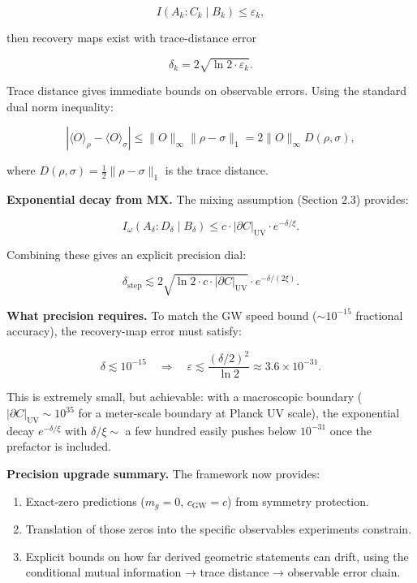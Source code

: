 \[
I(A_k : C_k \mid B_k) \le \varepsilon_k,
\]

then recovery maps exist with trace-distance error

\[
\delta_k = 2\sqrt{\ln 2 \cdot \varepsilon_k}.
\]

Trace distance gives immediate bounds on observable errors. Using the standard dual norm inequality:

\[
|\langle O \rangle_\rho - \langle O \rangle_\sigma|
\le \|O\|_\infty \|\rho - \sigma\|_1 = 2 \|O\|_\infty D(\rho, \sigma),
\]

where \(D(\rho, \sigma) = \frac{1}{2}\|\rho - \sigma\|_1\) is the trace distance.

\textbf{Exponential decay from MX.} The mixing assumption (Section 2.3) provides:

\[
I_\omega(A_\delta : D_\delta \mid B_\delta)
\le c \cdot |\partial C|_{\mathrm{UV}} \cdot e^{-\delta/\xi}.
\]

Combining these gives an explicit precision dial:

\[
\delta_{\mathrm{step}} \lesssim 2\sqrt{\ln 2 \cdot c \cdot |\partial C|_{\mathrm{UV}}}
\cdot e^{-\delta/(2\xi)}.
\]

\textbf{What precision requires.} To match the GW speed bound (\(\sim 10^{-15}\) fractional accuracy), the recovery-map error must satisfy:

\[
\delta \lesssim 10^{-15}
\quad \Rightarrow \quad
\varepsilon \lesssim \frac{(\delta/2)^2}{\ln 2} \approx 3.6 \times 10^{-31}.
\]

This is extremely small, but achievable: with a macroscopic boundary (\(|\partial C|_{\mathrm{UV}} \sim 10^{35}\) for a meter-scale boundary at Planck UV scale), the exponential decay \(e^{-\delta/\xi}\) with \(\delta/\xi \sim\) a few hundred easily pushes below \(10^{-31}\) once the prefactor is included.

\textbf{Precision upgrade summary.} The framework now provides:

\begin{enumerate}
\def\labelenumi{\arabic{enumi}.}
\tightlist
\item
  Exact-zero predictions (\(m_g = 0\), \(c_{\mathrm{GW}} = c\)) from symmetry protection.
\item
  Translation of those zeros into the specific observables experiments constrain.
\item
  Explicit bounds on how far derived geometric statements can drift, using the conditional mutual information → trace distance → observable error chain.
\end{enumerate}

